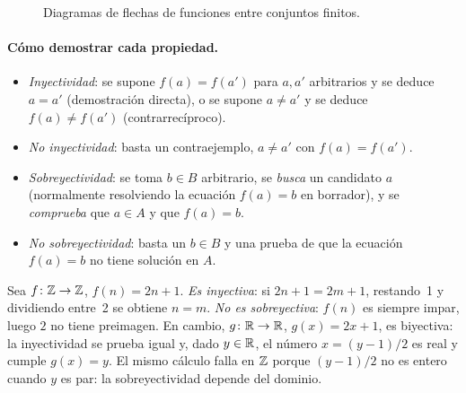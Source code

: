 \begin{figure}[h]
\centering
{}
\caption{Diagramas de flechas de funciones entre conjuntos finitos.}
\label{fig:t3-flechas}
\end{figure}

\paragraph{Cómo demostrar cada propiedad.}
\begin{itemize}[leftmargin=1.4em]
  \item \emph{Inyectividad}: se supone $f(a)=f(a')$ para $a,a'$ arbitrarios y se deduce $a=a'$ (demostración directa), o se supone $a\neq a'$ y se deduce $f(a)\neq f(a')$ (contrarrecíproco).
  \item \emph{No inyectividad}: basta un contraejemplo, $a\neq a'$ con $f(a)=f(a')$.
  \item \emph{Sobreyectividad}: se toma $b\in B$ arbitrario, se \emph{busca} un candidato $a$ (normalmente resolviendo la ecuación $f(a)=b$ en borrador), y se \emph{comprueba} que $a\in A$ y que $f(a)=b$.
  \item \emph{No sobreyectividad}: basta un $b\in B$ y una prueba de que la ecuación $f(a)=b$ no tiene solución en $A$.
\end{itemize}

\begin{ejemplo}\label{ej:t3-2n1}
Sea $f\colon\mathbb{Z}\to\mathbb{Z}$, $f(n)=2n+1$. \emph{Es inyectiva}: si $2n+1=2m+1$, restando~1 y dividiendo entre~2 se obtiene $n=m$. \emph{No es sobreyectiva}: $f(n)$ es siempre impar, luego $2$ no tiene preimagen. En cambio, $g\colon\mathbb{R}\to\mathbb{R}$, $g(x)=2x+1$, es biyectiva: la inyectividad se prueba igual y, dado $y\in\mathbb{R}$, el número $x=(y-1)/2$ es real y cumple $g(x)=y$. El mismo cálculo falla en $\mathbb{Z}$ porque $(y-1)/2$ no es entero cuando $y$ es par: la sobreyectividad depende del dominio.
\end{ejemplo}

